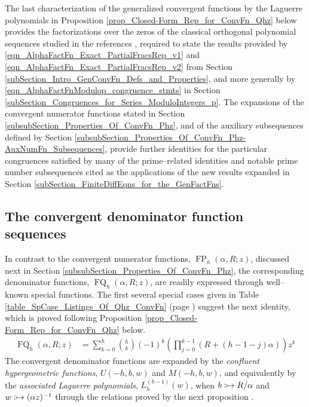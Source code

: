 \documentclass[12pt,reqno]{article}
\numberwithin{sfootnote}{section}
\newcommand{\tableref}[1]{Table \ref{#1} (page \pageref{#1})}
\numberwithin{equation}{section}
\theoremstyle{plain}
\theoremstyle{definition}
\theoremstyle{remark}
\newcommand{\cf}[0]{cf.\ }
\newcommand{\defmapsto}{\ensuremath{\vcentcolon\mapsto}}
\newcommand{\HypU}[3]{\ensuremath{U\left(#1, #2, #3\right)}}
\newcommand{\HypM}[3]{\ensuremath{M\left(#1, #2, #3\right)}}
\DeclareMathOperator{\FP}{FP}
\DeclareMathOperator{\FQ}{FQ}
\begin{document}
The last characterization of the generalized convergent functions by the 
Laguerre polynomials in 
Proposition \ref{prop_Closed-Form_Rep_for_ConvFn_Qhz} 
below provides the factorizations over the 
zeros of the classical orthogonal polynomial sequences studied in the 
references \citep{LGWORKS-ASYMP-SPFNZEROS2008,PROPS-ZEROS-CHYPFNS80}, 
required to state the results provided by 
\eqref{eqn_AlphaFactFn_Exact_PartialFracsRep_v1} and 
\eqref{eqn_AlphaFactFn_Exact_PartialFracsRep_v2} from 
Section \ref{subSection_Intro_GenConvFn_Defs_and_Properties}, and 
more generally by 
\eqref{eqn_AlphaFactFnModulop_congruence_stmts} in 
Section \ref{subSection_Congruences_for_Series_ModuloIntegers_p}. 
The expansions of the convergent numerator functions stated in 
Section \ref{subsubSection_Properties_Of_ConvFn_Phz}, and 
of the auxiliary subsequences defined by 
Section \ref{subsubSection_Properties_Of_ConvFn_Phz-AuxNumFn_Subsequences}, 
provide further identities for the particular congruences satisfied by 
many of the prime--related identities and notable prime number subsequences 
cited as the applications of the new results expanded in 
Section \ref{subSection_FiniteDiffEqns_for_the_GenFactFns}. 

\subsection{The convergent denominator function sequences} 
\label{subsubSection_Properties_Of_ConvFn_Qhz} 

In contrast to the convergent numerator functions, 
$\FP_h(\alpha, R; z)$, discussed next in 
Section \ref{subsubSection_Properties_Of_ConvFn_Phz}, the 
corresponding denominator functions, $\FQ_h(\alpha, R; z)$, 
are readily expressed through well--known special functions. 
The first several special cases given in 
\tableref{table_SpCase_Listings_Of_Qhz_ConvFn} 
suggest the next identity, which is proved following 
Proposition \ref{prop_Closed-Form_Rep_for_ConvFn_Qhz} below. 
\begin{align} 
\label{eqn_PFact_Qhz_product_ident} 
\FQ_h(\alpha, R; z) & = 
     \sum_{k=0}^{h} \binom{h}{k} (-1)^{k} \left(\prod_{j=0}^{k-1} 
     (R + (h-1-j)\alpha)\right) z^k 
\end{align} 
The convergent denominator functions are expanded by the 
\emph{confluent hypergeometric functions}, 
$\HypU{-h}{b}{w}$ and $\HypM{-h}{b}{w}$, 
and equivalently by the 
\emph{associated Laguerre polynomials}, $L_h^{(b-1)}(w)$, 
when $b \defmapsto R / \alpha$ and $w \defmapsto (\alpha z)^{-1}$ 
through the relations proved by the next proposition 
\citep[\cf \S 18.6(iv); \S 13.9(ii)]{NISTHB}. 
\end{document}
